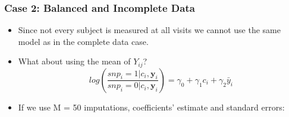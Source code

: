 \documentclass[pdf]{beamer}
\begin{document}
\begin{frame}
\frametitle{Case 2: Balanced and Incomplete Data}
\begin{itemize}
	\setlength\itemsep{0.8em}
	\item Since not every subject is measured at all visits we cannot use the same model as in the complete data case.
	\item What about using the mean of $Y_{ij}$?
		\begin{equation}\nonumber
		log\left(\frac{snp_i = 1 | c_i, \boldsymbol{y}_i}{snp_i = 0 | c_i, \boldsymbol{y}_i}\right) = \gamma_0 + \gamma_1 c_i + \gamma_2 \bar{y}_{i}
		\end{equation}
	\item If we use M = 50 imputations, coefficients' estimate and standard errors:
\end{itemize}
\begin{table}[H]
\centering
{}
\end{table}
\end{frame}
\end{document}
